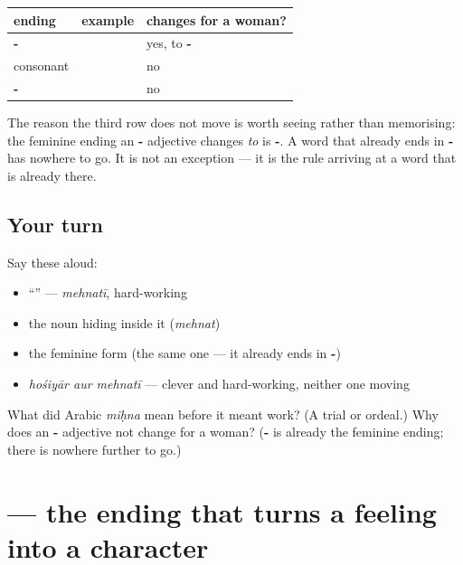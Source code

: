 \begin{grammarlens}[title={Grammar Lens: the third shape, and why it also stays put}]
\noindent
\begin{tabularx}{\linewidth}{@{}>{\raggedright\arraybackslash}X>{\raggedright\arraybackslash}X>{\raggedright\arraybackslash}X@{}}
\toprule
\textbf{ending} & \textbf{example} & \textbf{changes for a woman?} \\
\midrule
\textbf{-\hi{आ}} & \hi{बुरा} & yes, to \textbf{-\hi{ई}} \\
consonant & \hi{होशियार} & no \\
\textbf{-\hi{ई}} & \hi{मेहनती} & no \\
\bottomrule
\end{tabularx}

The reason the third row does not move is worth seeing rather than memorising: the feminine ending an \textbf{-} adjective changes \emph{to} is \textbf{-}. A word that already ends in \textbf{-} has nowhere to go. It is not an exception — it is the rule arriving at a word that is already there.
\end{grammarlens}

\subsection*{Your turn}
Say these aloud:

\begin{itemize}
\raggedright
  \item \textquotedblleft{}\textquotedblright{} — \emph{mehnatī}, hard-working
  \item the noun hiding inside it (\emph{mehnat})
  \item the feminine form (the same one — it already ends in \textbf{-})
  \item \emph{hośiyār aur mehnatī} — clever and hard-working, neither one moving
\end{itemize}

\begin{tcolorbox}[breakable,colback=teal!4,colframe=teal!35!black,title={Before you move on}]
What did Arabic \emph{miḥna} mean before it meant work? (A trial or ordeal.) Why does an \textbf{-} adjective not change for a woman? (\textbf{-} is already the feminine ending; there is nowhere further to go.)
\end{tcolorbox}
\section[\texorpdfstring{\hi{शर्मीला} (śarmīlā)}{शर्मीला (śarmīlā)}]{ — the ending that turns a feeling into a character}

